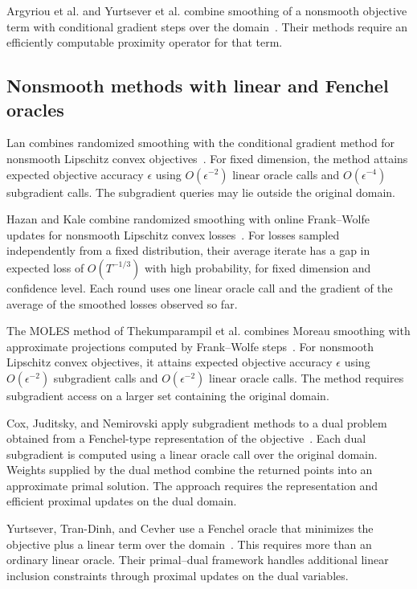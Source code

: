 Argyriou et al. and Yurtsever et al. combine smoothing of a nonsmooth
objective term with conditional gradient steps over the
domain~\cite{argyriou2014hybrid,yurtsever2018conditional}.
Their methods require an efficiently computable proximity operator
for that term.

\subsection{Nonsmooth methods with linear and Fenchel oracles}

Lan combines randomized smoothing with the conditional gradient method
for nonsmooth Lipschitz convex objectives~\cite{lan2014complexity}.
For fixed dimension, the method attains expected objective accuracy
$\epsilon$ using $O(\epsilon^{-2})$ linear oracle calls and
$O(\epsilon^{-4})$ subgradient calls. The subgradient queries may lie
outside the original domain.

Hazan and Kale combine randomized smoothing with online Frank--Wolfe
updates for nonsmooth Lipschitz convex
losses~\cite[Theorem~4.3]{10.5555/3042573.3042808}. For losses sampled
independently from a fixed distribution, their average iterate has
a gap in expected loss of $O(T^{-1/3})$ with high probability, for fixed
dimension and confidence level. Each round uses one linear oracle
call and the gradient of the average of the smoothed losses observed
so far.

The MOLES method of Thekumparampil et al. combines Moreau smoothing
with approximate projections computed by Frank--Wolfe
steps~\cite{thekumparampil2020projection}. For nonsmooth Lipschitz
convex objectives, it attains expected objective accuracy $\epsilon$
using $O(\epsilon^{-2})$ subgradient calls and $O(\epsilon^{-2})$
linear oracle calls.
The method requires subgradient
access on a larger set containing the original domain.

Cox, Juditsky, and Nemirovski apply subgradient methods to a dual
problem obtained from a Fenchel-type representation of the
objective~\cite{cox2014dual}. Each dual subgradient is computed using
a linear oracle call over the original domain. Weights supplied by
the dual method combine the returned points into an approximate
primal solution. The approach requires the representation and
efficient proximal updates on the dual domain.

Yurtsever, Tran-Dinh, and Cevher use a Fenchel oracle that minimizes
the objective plus a linear term over the
domain~\cite{yurtsever2015universal}. This requires more than an
ordinary linear oracle. Their primal--dual framework handles
additional linear inclusion constraints through proximal updates
on the dual variables.

